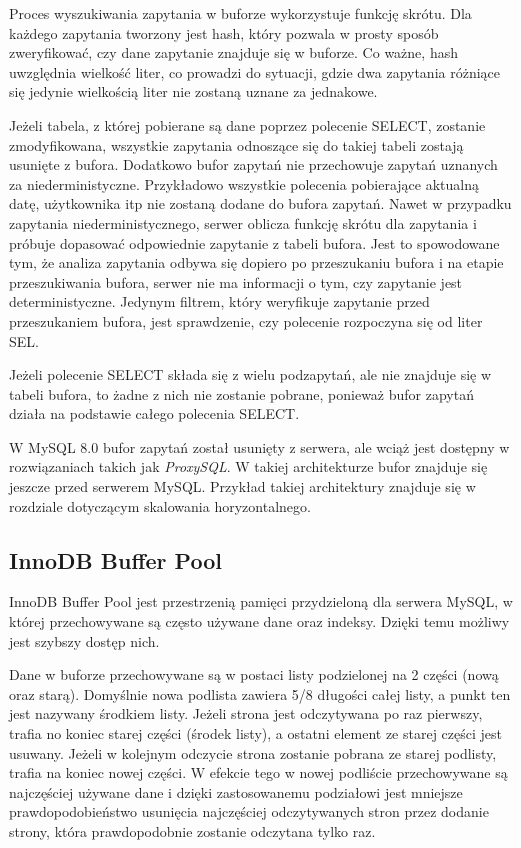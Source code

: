 Proces wyszukiwania zapytania w buforze wykorzystuje funkcję skrótu. Dla każdego zapytania tworzony jest hash, który pozwala w prosty sposób zweryfikować, czy dane zapytanie znajduje się w buforze. Co ważne, hash uwzględnia wielkość liter, co prowadzi do sytuacji, gdzie dwa zapytania różniące się jedynie wielkością liter nie zostaną uznane za jednakowe.

Jeżeli tabela, z której pobierane są dane poprzez polecenie SELECT, zostanie zmodyfikowana, wszystkie zapytania odnoszące się do takiej tabeli zostają usunięte z bufora. Dodatkowo bufor zapytań nie przechowuje zapytań uznanych za niederministyczne. Przykładowo wszystkie polecenia pobierające aktualną datę, użytkownika itp nie zostaną dodane do bufora zapytań. Nawet w przypadku zapytania niederministycznego, serwer oblicza funkcję skrótu dla zapytania i próbuje dopasować odpowiednie zapytanie z tabeli bufora. Jest to spowodowane tym, że analiza zapytania odbywa się dopiero po przeszukaniu bufora i na etapie przeszukiwania bufora, serwer nie ma informacji o tym, czy zapytanie jest deterministyczne. Jedynym filtrem, który weryfikuje zapytanie przed przeszukaniem bufora, jest sprawdzenie, czy polecenie rozpoczyna się od liter SEL.

Jeżeli polecenie SELECT składa się z wielu podzapytań, ale nie znajduje się w tabeli bufora, to żadne z nich nie zostanie pobrane, ponieważ bufor zapytań działa na podstawie całego polecenia SELECT.

W MySQL 8.0 bufor zapytań został usunięty z serwera, ale wciąż jest dostępny w rozwiązaniach takich jak \textit{ProxySQL}. W takiej architekturze bufor znajduje się jeszcze przed serwerem MySQL. Przykład takiej architektury znajduje się w rozdziale dotyczącym skalowania horyzontalnego.

\subsection{InnoDB Buffer Pool}

InnoDB Buffer Pool jest przestrzenią pamięci przydzieloną dla serwera MySQL, w której przechowywane są często używane dane oraz indeksy. Dzięki temu możliwy jest szybszy dostęp nich. 

Dane w buforze przechowywane są w postaci listy podzielonej na 2 części (nową oraz starą). Domyślnie nowa podlista zawiera 5/8 długości całej listy, a punkt ten jest nazywany środkiem listy. Jeżeli strona jest odczytywana po raz pierwszy, trafia no koniec starej części (środek listy), a ostatni element ze starej części jest usuwany. Jeżeli w kolejnym odczycie strona zostanie pobrana ze starej podlisty, trafia na koniec nowej części. W efekcie tego w nowej podliście przechowywane są najczęściej używane dane i dzięki zastosowanemu podziałowi jest mniejsze prawdopodobieństwo usunięcia najczęściej odczytywanych stron przez dodanie strony, która prawdopodobnie zostanie odczytana tylko raz.


